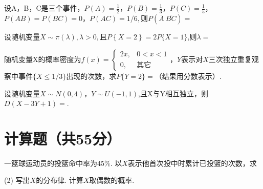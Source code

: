 \documentclass[
    newtxsf,
    twoside,openany,
]{litesolution}
\begin{document}
\begin{problem}
    设A，B，C是三个事件，$P(A)=\frac12$，$P(B)=\frac13$，$P(C)=\frac15$，$P(AB)=P(BC)=0$，$P(AC)=1/6,则P(\overline A\ \overline{BC})=$\ans{}
\end{problem}
\begin{solution}

\end{solution}

\begin{problem}
    设随机变量$X\sim\pi(\lambda),\lambda>0,且P\left\{X=2\right\}=2P\{X=1\}$,则$\lambda=$\ans{}
\end{problem}
\begin{solution}

\end{solution}

\begin{problem}
    随机变量X的概率密度为$f(x)=
    \begin{cases}
        2x, &0<x<1\\
        0,  &\text{其它}
    \end{cases}$，$Y$表示对$X$三次独立重复观察中事件$\{X\leq1/3\}$出现的次数，求$P\{Y=2\}=$\ans{}（结果用分数表示）.
\end{problem}
\begin{solution}

\end{solution}

\begin{problem}
    设随机变量$X\sim N(0,4)$，$Y\sim U(-1,1)$,且X与Y相互独立，则$D(X-3Y+1)=$\ans{}.
\end{problem}
\begin{solution}

\end{solution}

\section{计算题（共55分）}

\begin{problem}[本题8分]
    一篮球运动员的投篮命中率为$45\%$. 以$X$表示他首次投中时累计已投篮的次数，求
    \begin{tasks}[label=\arabic*.](2)
        \task 写出$X$的分布律.
        \task 计算$X$取偶数的概率.
    \end{tasks}
\end{problem}
\begin{solution}

\end{solution}
\end{document}
